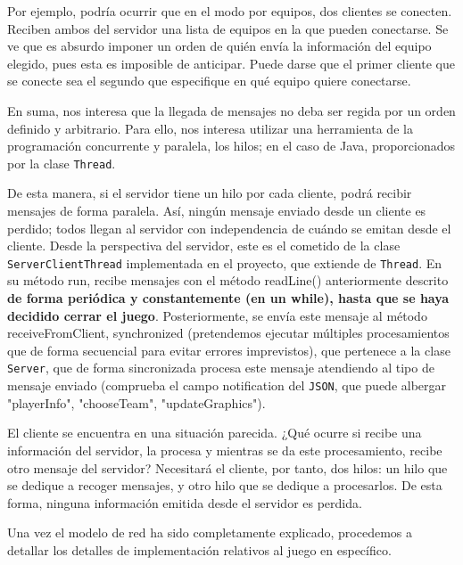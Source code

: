 \documentclass[12pt,a4paper,openright]{book}
\theoremstyle{break}
\begin{document}
Por ejemplo, podría ocurrir que en el modo por equipos, dos clientes se conecten. Reciben ambos del servidor una lista de equipos en la que pueden conectarse. Se ve que es absurdo imponer un orden de quién envía la información del equipo elegido, pues esta es imposible de anticipar. Puede darse que el primer cliente que se conecte sea el segundo que especifique en qué equipo quiere conectarse.

En suma, nos interesa que la llegada de mensajes no deba ser regida por un orden definido y arbitrario. Para ello, nos interesa utilizar una herramienta de la programación concurrente y paralela, los hilos; en el caso de Java, proporcionados por la clase \texttt{Thread}.

De esta manera, si el servidor tiene un hilo por cada cliente, podrá recibir mensajes de forma paralela. Así, ningún mensaje enviado desde un cliente es perdido; todos llegan al servidor con independencia de cuándo se emitan desde el cliente. Desde la perspectiva del servidor, este es el cometido de la clase \texttt{ServerClientThread} implementada en el proyecto, que extiende de \texttt{Thread}. En su método run, recibe mensajes con el método readLine() anteriormente descrito \textbf{de forma periódica y constantemente (en un while), hasta que se haya decidido cerrar el juego}. Posteriormente, se envía este mensaje al método receiveFromClient, synchronized (pretendemos ejecutar múltiples procesamientos que de forma secuencial para evitar errores imprevistos), que pertenece a la clase \texttt{Server}, que de forma sincronizada procesa este mensaje atendiendo al tipo de mensaje enviado (comprueba el campo notification del \texttt{JSON}, que puede albergar "playerInfo", "chooseTeam", "updateGraphics").

El cliente se encuentra en una situación parecida. ¿Qué ocurre si recibe una información del servidor, la procesa y mientras se da este procesamiento, recibe otro mensaje del servidor? Necesitará el cliente, por tanto, dos hilos: un hilo que se dedique a recoger mensajes, y otro hilo que se dedique a procesarlos. De esta forma, ninguna información emitida desde el servidor es perdida.

Una vez el modelo de red ha sido completamente explicado, procedemos a detallar los detalles de implementación relativos al juego en específico.
\end{document}

